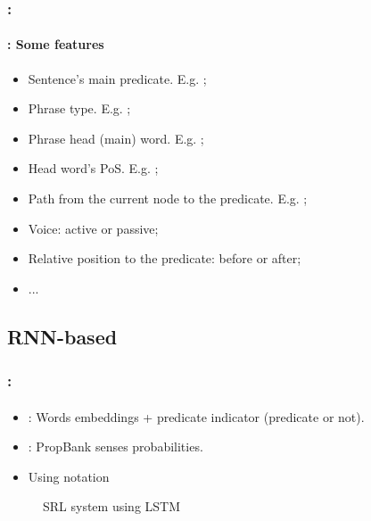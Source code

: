 \documentclass[xcolor=table]{beamer}
\begin{document}
\begin{frame}
	\frametitle{\insertshortsubtitle: \insertsection}
	\framesubtitle{\insertsubsection: Some features}

	\begin{itemize}
		\item Sentence's main predicate. E.g. ;
		\item Phrase type. E.g. ;
		\item Phrase head (main) word. E.g. ; 
		\item Head word's PoS. E.g. ;
		\item Path from the current node to the predicate. E.g. ;
		\item Voice: active or passive;
		\item Relative position to the predicate: before or after;
		\item ...
	\end{itemize}
	
\end{frame}

\subsection{RNN-based}

\begin{frame}
	\frametitle{\insertshortsubtitle: \insertsection}
	\framesubtitle{\insertsubsection}

	\begin{minipage}{.48\textwidth}
		\begin{itemize}
			\item {}: Words embeddings + predicate indicator (predicate or not).
			\item {}: PropBank senses probabilities.  
			\item Using  notation
		\end{itemize}
	\end{minipage}
	\begin{minipage}{.5\textwidth}
		\begin{figure}
			\caption{SRL system using LSTM \cite{2017-he-al}}
		\end{figure}
	\end{minipage}
	
\end{frame}
\end{document}
